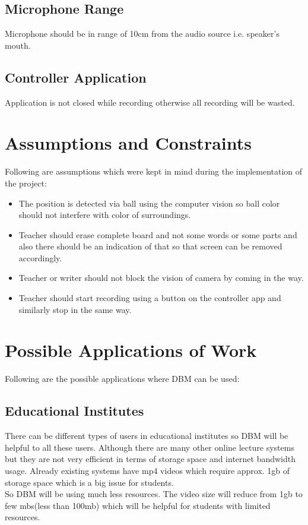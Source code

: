 \subsection{Microphone Range}
Microphone should be in range of 10cm from the audio source i.e. speaker's mouth.

\subsection{Controller Application}
Application is not closed while recording otherwise all recording will be wasted.

\section{Assumptions and Constraints}

Following are assumptions which were kept in mind during the implementation of the project:

\begin{itemize}

\item The position is detected via ball using the computer vision so ball color should not interfere with color of surroundings.

\item Teacher should erase complete board and not some words or some parts and also there should be an indication of that so that screen can be removed accordingly.

\item Teacher or writer should not block the vision of camera by coming in the way.

\item Teacher should start recording using a button on the controller app and similarly stop in the same way.

\end{itemize}
\bigskip


\section{Possible Applications of Work}
Following are the possible applications where DBM can be used:
\bigskip

\subsection{Educational Institutes}
There can be different types of users in educational institutes so DBM will be helpful to all these users. Although there are many other online lecture systems but they are not very efficient in terms of storage space and internet bandwidth usage. Already existing systems have mp4 videos which require approx. 1gb of storage space which is a big issue for students.\\
So DBM will be using much less resources. The video size will reduce from 1gb to few mbs(less than 100mb) which will be helpful for students with limited resources.
\bigskip

